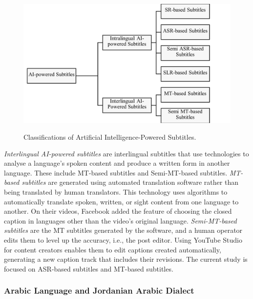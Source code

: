 \documentclass[english]{textolivre}
\begin{document}
\begin{figure}[htbp]
\centering
\begin{minipage}{.7\textwidth}
\includegraphics[width=\textwidth]{Picture3.png}
\caption{Classifications of Artificial Intelligence-Powered
	Subtitles.}
\label{fig:fig3}
\end{minipage}
\end{figure}


\emph{Interlingual AI-powered subtitles} are interlingual subtitles that
use technologies to analyse a language's spoken content and produce a
written form in another language. These include MT-based subtitles and
Semi-MT-based subtitles. \emph{MT-based subtitles} are generated using
automated translation software rather than being translated by human
translators. This technology uses algorithms to automatically translate
spoken, written, or sight content from one language to another. On their
videos, Facebook added the feature of choosing the closed caption in
languages other than the video's original language. \emph{Semi-MT-based
subtitles} are the MT subtitles generated by the software, and a human
operator edits them to level up the accuracy, i.e., the post editor.
Using YouTube Studio for content creators enables them to edit captions
created automatically, generating a new caption track that includes
their revisions. The current study is focused on ASR-based subtitles and
MT-based subtitles.
	
\subsubsection{Arabic Language and Jordanian Arabic Dialect}\label{subsubsec-Arabic-Language-and-Jordanian-Arabic-Dialect}
\end{document}
